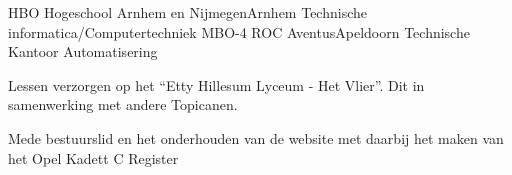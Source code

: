 \documentclass[
	a4paper
]{babelviscv}
\begin{document}
	\begin{cvtable}[1.5]
				{HBO Hogeschool Arnhem en Nijmegen}{Arnhem}
				{Technische informatica/Computertechniek}
				{MBO-4 ROC Aventus}{Apeldoorn}
				{Technische Kantoor Automatisering}
	\end{cvtable}

	\begin{cvtable}[1.5]
	\end{cvtable}

		\begin{cvtable}[1.5]
				{Lessen verzorgen op het “Etty Hillesum Lyceum - Het Vlier”. Dit in samenwerking met andere Topicanen.}
		\end{cvtable}

		\begin{cvtable}[1.5]
				{Mede bestuurslid en het onderhouden van de website met daarbij het maken van het Opel Kadett C Register}
		\end{cvtable}

\cvsignature
\end{document}

